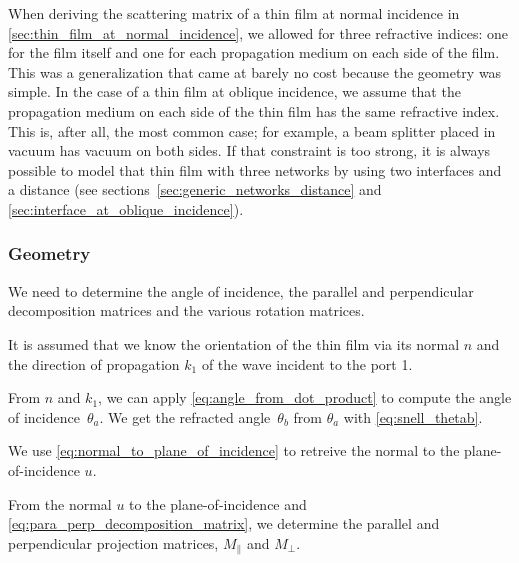 When deriving the scattering matrix of a thin film at normal incidence in \cref{sec:thin_film_at_normal_incidence}, we allowed for three refractive indices: one for the film itself and one for each propagation medium on each side of the film.
This was a generalization that came at barely no cost because the geometry was simple.
In the case of a thin film at oblique incidence, we assume that the propagation medium on each side of the thin film has the same refractive index.
This is, after all, the most common case;
for example, a beam splitter placed in vacuum has vacuum on both sides.
If that constraint is too strong, it is always possible to model that thin film with three networks by using two interfaces and a distance (see sections~\ref{sec:generic_networks_distance} and \ref{sec:interface_at_oblique_incidence}).

\subsubsection{Geometry}
\label{sec:thin_film_geometry}
We need to determine the angle of incidence, the parallel and perpendicular decomposition matrices and the various rotation matrices.

It is assumed that we know the orientation of the thin film via its normal $n$ and the direction of propagation $k_1$ of the wave incident to the port 1.

From $n$ and $k_1$, we can apply \cref{eq:angle_from_dot_product} to compute the angle of incidence~$\theta_a$.
We get the refracted angle~$\theta_b$ from $\theta_a$ with \cref{eq:snell_thetab}.

We use \cref{eq:normal_to_plane_of_incidence} to retreive the normal to the plane-of-incidence $u$.

From the normal $u$ to the plane-of-incidence
and \cref{eq:para_perp_decomposition_matrix},
we determine the parallel and perpendicular projection matrices,
$M_\parallel$ and $M_\perp$.

